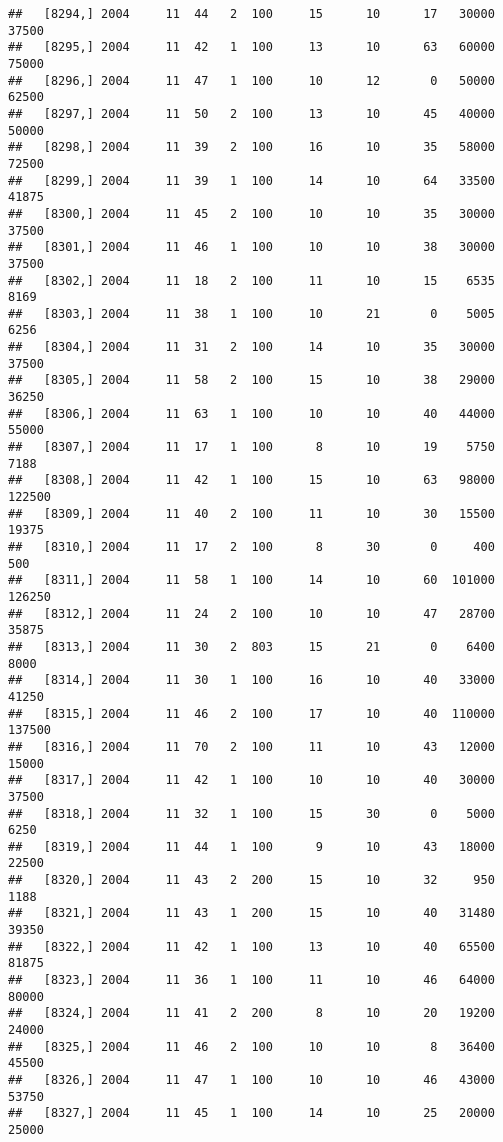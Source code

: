 \documentclass{article}\usepackage[]{graphicx}\usepackage[]{color}
\makeatletter
\newenvironment{kframe}{%
 \def\at@end@of@kframe{}%
 \ifinner\ifhmode%
  \def\at@end@of@kframe{\end{minipage}}%
  \begin{minipage}{\columnwidth}%
 \fi\fi%
 \def\FrameCommand##1{\hskip\@totalleftmargin \hskip-\fboxsep
 \colorbox{shadecolor}{##1}\hskip-\fboxsep
     \hskip-\linewidth \hskip-\@totalleftmargin \hskip\columnwidth}%
 \MakeFramed {\advance\hsize-\width
   \@totalleftmargin\z@ \linewidth\hsize
   \@setminipage}}%
 {\par\unskip\endMakeFramed%
 \at@end@of@kframe}
\newenvironment{knitrout}{}{} %
\makeatother
\begin{document}
\begin{knitrout}
\begin{kframe}
\begin{verbatim}
##   [8294,] 2004     11  44   2  100     15      10      17   30000   37500
##   [8295,] 2004     11  42   1  100     13      10      63   60000   75000
##   [8296,] 2004     11  47   1  100     10      12       0   50000   62500
##   [8297,] 2004     11  50   2  100     13      10      45   40000   50000
##   [8298,] 2004     11  39   2  100     16      10      35   58000   72500
##   [8299,] 2004     11  39   1  100     14      10      64   33500   41875
##   [8300,] 2004     11  45   2  100     10      10      35   30000   37500
##   [8301,] 2004     11  46   1  100     10      10      38   30000   37500
##   [8302,] 2004     11  18   2  100     11      10      15    6535    8169
##   [8303,] 2004     11  38   1  100     10      21       0    5005    6256
##   [8304,] 2004     11  31   2  100     14      10      35   30000   37500
##   [8305,] 2004     11  58   2  100     15      10      38   29000   36250
##   [8306,] 2004     11  63   1  100     10      10      40   44000   55000
##   [8307,] 2004     11  17   1  100      8      10      19    5750    7188
##   [8308,] 2004     11  42   1  100     15      10      63   98000  122500
##   [8309,] 2004     11  40   2  100     11      10      30   15500   19375
##   [8310,] 2004     11  17   2  100      8      30       0     400     500
##   [8311,] 2004     11  58   1  100     14      10      60  101000  126250
##   [8312,] 2004     11  24   2  100     10      10      47   28700   35875
##   [8313,] 2004     11  30   2  803     15      21       0    6400    8000
##   [8314,] 2004     11  30   1  100     16      10      40   33000   41250
##   [8315,] 2004     11  46   2  100     17      10      40  110000  137500
##   [8316,] 2004     11  70   2  100     11      10      43   12000   15000
##   [8317,] 2004     11  42   1  100     10      10      40   30000   37500
##   [8318,] 2004     11  32   1  100     15      30       0    5000    6250
##   [8319,] 2004     11  44   1  100      9      10      43   18000   22500
##   [8320,] 2004     11  43   2  200     15      10      32     950    1188
##   [8321,] 2004     11  43   1  200     15      10      40   31480   39350
##   [8322,] 2004     11  42   1  100     13      10      40   65500   81875
##   [8323,] 2004     11  36   1  100     11      10      46   64000   80000
##   [8324,] 2004     11  41   2  200      8      10      20   19200   24000
##   [8325,] 2004     11  46   2  100     10      10       8   36400   45500
##   [8326,] 2004     11  47   1  100     10      10      46   43000   53750
##   [8327,] 2004     11  45   1  100     14      10      25   20000   25000

\end{verbatim}
\end{kframe}
\end{knitrout}
\end{document}

